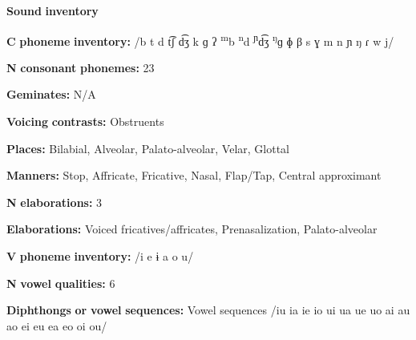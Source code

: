 \begin{styleBody}
\textbf{Sound} \textbf{inventory}
\end{styleBody}

\begin{styleBody}
\textbf{C} \textbf{phoneme} \textbf{inventory:} /b t d t͡ʃ d͡ʒ k ɡ ʔ \textsuperscript{m}b \textsuperscript{n}d \textsuperscript{ɲ}d͡ʒ \textsuperscript{ŋ}ɡ ɸ β s ɣ m n ɲ ŋ ɾ w j/
\end{styleBody}

\begin{styleBody}
\textbf{N} \textbf{consonant} \textbf{phonemes:} 23
\end{styleBody}

\begin{styleBody}
\textbf{Geminates:} N/A
\end{styleBody}

\begin{styleBody}
\textbf{Voicing} \textbf{contrasts:} Obstruents
\end{styleBody}

\begin{styleBody}
\textbf{Places:} Bilabial, Alveolar, Palato-alveolar, Velar, Glottal
\end{styleBody}

\begin{styleBody}
\textbf{Manners:} Stop, Affricate, Fricative, Nasal, Flap/Tap, Central approximant
\end{styleBody}

\begin{styleBody}
\textbf{N} \textbf{elaborations:} 3
\end{styleBody}

\begin{styleBody}
\textbf{Elaborations:} Voiced fricatives/affricates, Prenasalization, Palato-alveolar
\end{styleBody}

\begin{styleBody}
\textbf{V} \textbf{phoneme} \textbf{inventory:} /i e ɨ a o u/
\end{styleBody}

\begin{styleBody}
\textbf{N} \textbf{vowel} \textbf{qualities:} 6
\end{styleBody}

\begin{styleBody}
\textbf{Diphthongs} \textbf{or} \textbf{vowel} \textbf{sequences:} Vowel sequences /iu ia ie io ui ua ue uo ai au ao ei eu ea eo oi ou/
\end{styleBody}

